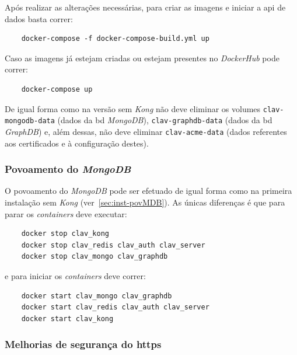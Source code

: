 Após realizar as alterações necessárias, para criar as imagens e iniciar a \acrshort{api} de dados basta correr:

\footnotesize
\begin{verbatim}
    docker-compose -f docker-compose-build.yml up
\end{verbatim}
\normalsize

Caso as imagens já estejam criadas ou estejam presentes no \textit{DockerHub} pode correr:

\footnotesize
\begin{verbatim}
    docker-compose up
\end{verbatim}
\normalsize

De igual forma como na versão sem \textit{Kong} não deve eliminar os volumes \texttt{clav-mongodb-data} (dados da \acrshort{bd} \textit{MongoDB}), \texttt{clav-graphdb-data} (dados da \acrshort{bd} \textit{GraphDB}) e, além dessas, não deve eliminar \texttt{clav-acme-data} (dados referentes aos certificados e à configuração destes).

\subsubsection{Povoamento do \textit{MongoDB}}

O povoamento do \textit{MongoDB} pode ser efetuado de igual forma como na primeira instalação sem \textit{Kong} (ver~\ref{sec:inst-povMDB}). As únicas diferenças é que para parar os \textit{containers} deve executar:

\footnotesize
\begin{verbatim}
    docker stop clav_kong
    docker stop clav_redis clav_auth clav_server
    docker stop clav_mongo clav_graphdb
    \end{verbatim}
\normalsize
\vspace{-0.5cm}

e para iniciar os \textit{containers} deve correr:

\footnotesize
    \begin{verbatim}
    docker start clav_mongo clav_graphdb
    docker start clav_redis clav_auth clav_server
    docker start clav_kong
    \end{verbatim}
\normalsize
\vspace{-0.5cm}

\subsubsection{Melhorias de segurança do \acrshort{https}}

